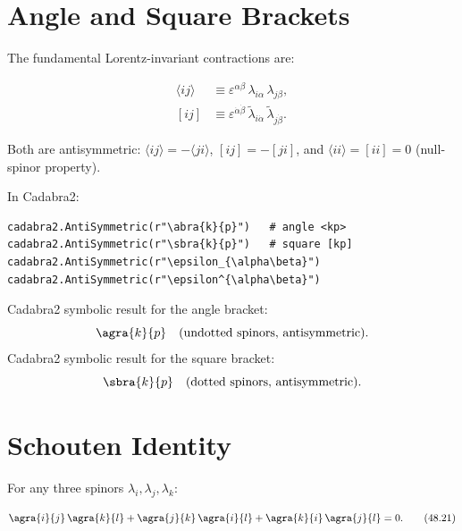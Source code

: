 \documentclass[12pt]{article}
\begin{document}
\section{Angle and Square Brackets}\label{sec:brackets}

The fundamental Lorentz-invariant contractions are:

\begin{mdframed}
\begin{align}
\langle ij\rangle &\equiv \varepsilon^{\alpha\beta}\,
\lambda_{i\alpha}\,\lambda_{j\beta} , \tag{48.16} \\[2mm]
[ij] &\equiv \varepsilon^{\dot\alpha\dot\beta}\,
\tilde\lambda_{i\dot\alpha}\,\tilde\lambda_{j\dot\beta} . \tag{48.17}
\end{align}
\end{mdframed}

Both are antisymmetric: $\langle ij\rangle=-\langle ji\rangle$,
$[ij]=-[ji]$, and $\langle ii\rangle=[ii]=0$ (null-spinor property).

In Cadabra2:
\begin{verbatim}
cadabra2.AntiSymmetric(r"\abra{k}{p}")   # angle <kp>
cadabra2.AntiSymmetric(r"\sbra{k}{p}")   # square [kp]
cadabra2.AntiSymmetric(r"\epsilon_{\alpha\beta}")
cadabra2.AntiSymmetric(r"\epsilon^{\alpha\beta}")
\end{verbatim}

Cadabra2 symbolic result for the angle bracket:
\begin{equation}
\agra{k}{p}\quad\text{(undotted spinors, antisymmetric)} .
\end{equation}
Cadabra2 symbolic result for the square bracket:
\begin{equation}
\sbra{k}{p}\quad\text{(dotted spinors, antisymmetric)} .
\end{equation}

\section{Schouten Identity}\label{sec:schouten}

For any three spinors $\lambda_i,\lambda_j,\lambda_k$:

\begin{mdframed}[backgroundcolor=yellow!5]
\begin{equation}
\agra{i}{j}\,\agra{k}{l}
+ \agra{j}{k}\,\agra{i}{l}
+ \agra{k}{i}\,\agra{j}{l} = 0 .
\tag{48.21}
\end{equation}
\end{mdframed}
\end{document}
